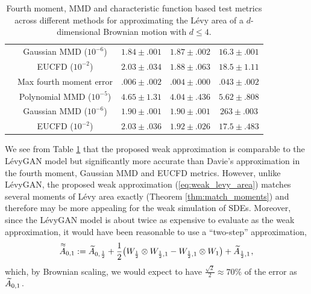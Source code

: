 \documentclass[sn-mathphys-num]{sn-jnl}%
\newcommand{\m}{\hspace{0.25mm}}
\begin{document}
\begin{table}[ht]
\begin{tabular}{@{}ccccc@{}}
  & Gaussian MMD ($10^{-6}$) & $\mathbf{1.84 \pm .001}$ & $1.87 \pm .002$ & \hspace{-2mm}$16.3\pm.001$ \\
  [2pt]
  & EUCFD ($10^{-2}$) & $2.03 \pm .034$ & $\mathbf{1.88\pm.063}$ & \hspace{-2mm}$18.5\pm1.11$ \\
 \midrule
\hspace{2mm}\multirow{4}{*}{4} 
 & Max fourth moment error & $.006 \pm .002$ & $\mathbf{.004 \pm .000}$ & \hspace{-2mm}$.043\pm.002$ \\[2pt]
 & Polynomial MMD ($10^{-5}$) & $4.65 \pm 1.31$ & $\mathbf{4.04 \pm .436}$ & \hspace{-2mm}$5.62 \pm .808$ \\[2pt]
  & Gaussian MMD ($10^{-6}$) & $\mathbf{1.90\pm.001}$ & $\mathbf{1.90 \pm .001}$ & \hspace{-2mm}$263\pm .003$ \\
  [2pt]
  & EUCFD ($10^{-2}$)& $2.03 \pm .036$ & $\mathbf{1.92\pm.026}$ & \hspace{-2mm}$17.5\pm.483$ \\
 \bottomrule
\end{tabular}\medbreak
\caption{Fourth moment, MMD and characteristic function based test metrics across different methods for approximating the L\'{e}vy area of a $d$-dimensional Brownian motion with $d\leq 4$.}\label{tab:levy_area_2}
\end{table}\vspace*{-2mm}
We see from Table \ref{tab:levy_area_2} that the proposed weak approximation is comparable to the L\'{e}vyGAN model but significantly more accurate than Davie's approximation in the fourth moment, Gaussian MMD and EUCFD metrics. However, unlike L\'{e}vyGAN, the proposed weak approximation (\ref{eq:weak_levy_area}) matches several moments of L\'{e}vy area exactly (Theorem \ref{thm:match_moments}) and therefore may be more appealing for the weak simulation of SDEs.
Moreover, since the L\'{e}vyGAN model is about twice as expensive to evaluate as the weak approximation, it would have been reasonable to use a ``two-step'' approximation,
\begin{align}\label{eq:chen_error}
\overset{\,\approx}{A}_{0,1} := \widetilde{A}_{0,\m\frac{1}{2}} + \frac{1}{2}\big(W_{\frac{1}{2}}\otimes W_{\frac{1}{2}, 1} - W_{\frac{1}{2}, 1}\otimes W_1\big) + \widetilde{A}_{\frac{1}{2}, 1}\m,
\end{align}
which, by Brownian scaling, we would expect to have $\frac{\sqrt{2}}{2}\approx 70\%$ of the error as $\widetilde{A}_{0,1}\m$.\medbreak
\end{document}
